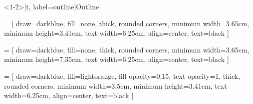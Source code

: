 \documentclass[aspectratio=169]{beamer}
\begin{document}
\begin{frame}<1-2>[t, label=outline]{Outline}

   = [
          draw=darkblue,
          fill=none,
          thick,
          rounded corners,
          minimum width=3.65cm,
          minimum height=3.41cm,
          text width=6.25cm,
          align=center,
          text=black
          ]

   = [
          draw=darkblue,
          fill=none,
          thick,
          rounded corners,
          minimum width=3.65cm,
          minimum height=7.35cm,
          text width=6.25cm,
          align=center,
          text=black
          ]

   = [
          draw=darkblue,
          fill=lightorange,
          fill opacity=0.15,
          text opacity=1,
          thick,
          rounded corners,
          minimum width=3.5cm,
          minimum height=3.41cm,
          text width=6.25cm,
          align=center,
          text=black
          ]

  \vspace{6pt}
\end{frame}
\end{document}
